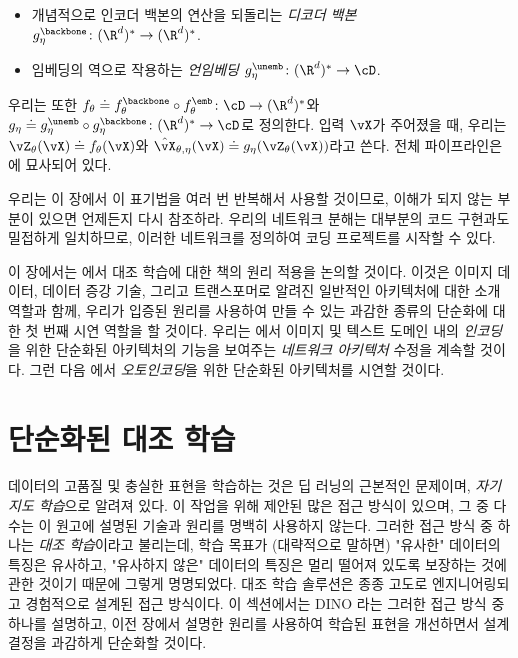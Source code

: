 \documentclass[../../book-main_ko.tex]{subfiles}
\begin{document}
\begin{itemize}
\begin{itemize}
        \item 개념적으로 인코더 백본의 연산을 되돌리는 \textit{디코더 백본} \(g_{\eta}^{\backbone} \colon (\R^{d})^{*} \to (\R^{d})^{*}\).
        \item 임베딩의 역으로 작용하는 \textit{언임베딩} \(g_{\eta}^{\unemb} \colon (\R^{d})^{*} \to \cD\).
    \end{itemize}
    우리는 또한 \(f_{\theta} \doteq f_{\theta}^{\backbone} \circ f_{\theta}^{\emb} \colon \cD \to (\R^{d})^{*}\)와 \(g_{\eta} \doteq g_{\eta}^{\unemb} \circ g_{\eta}^{\backbone} \colon (\R^{d})^{*} \to \cD\)로 정의한다. 입력 \(\vX\)가 주어졌을 때, 우리는 \(\vZ_{\theta}(\vX) \doteq f_{\theta}(\vX)\)와 \(\hat{\vX}_{\theta, \eta}(\vX) \doteq g_{\eta}(\vZ_{\theta}(\vX))\)라고 쓴다. 전체 파이프라인은 에 묘사되어 있다.
\end{itemize}

우리는 이 장에서 이 표기법을 여러 번 반복해서 사용할 것이므로, 이해가 되지 않는 부분이 있으면 언제든지 다시 참조하라. 우리의 네트워크 분해는 대부분의 코드 구현과도 밀접하게 일치하므로, 이러한 네트워크를 정의하여 코딩 프로젝트를 시작할 수 있다.

이 장에서는 에서 대조 학습에 대한 책의 원리 적용을 논의할 것이다. 이것은 이미지 데이터, 데이터 증강 기술, 그리고 트랜스포머로 알려진 일반적인 아키텍처에 대한 소개 역할과 함께, 우리가 입증된 원리를 사용하여 만들 수 있는 과감한 종류의 단순화에 대한 첫 번째 시연 역할을 할 것이다. 우리는 에서 이미지 및 텍스트 도메인 내의 \textit{인코딩}을 위한 단순화된 아키텍처의 기능을 보여주는 \textit{네트워크 아키텍처} 수정을 계속할 것이다. 그런 다음 에서 \textit{오토인코딩}을 위한 단순화된 아키텍처를 시연할 것이다. %

\section{단순화된 대조 학습}\label{sec:contrastive_learning}

데이터의 고품질 및 충실한 표현을 학습하는 것은 딥 러닝의 근본적인 문제이며, \textit{자기 지도 학습}으로 알려져 있다. 이 작업을 위해 제안된 많은 접근 방식이 있으며, 그 중 다수는 이 원고에 설명된 기술과 원리를 명백히 사용하지 않는다. 그러한 접근 방식 중 하나는 \textit{대조 학습}이라고 불리는데, 학습 목표가 (대략적으로 말하면) "유사한" 데이터의 특징은 유사하고, "유사하지 않은" 데이터의 특징은 멀리 떨어져 있도록 보장하는 것에 관한 것이기 때문에 그렇게 명명되었다. 대조 학습 솔루션은 종종 고도로 엔지니어링되고 경험적으로 설계된 접근 방식이다. 이 섹션에서는 DINO \citep{caron2021emerging}라는 그러한 접근 방식 중 하나를 설명하고, 이전 장에서 설명한 원리를 사용하여 학습된 표현을 개선하면서 설계 결정을 과감하게 단순화할 것이다.
\end{document}
